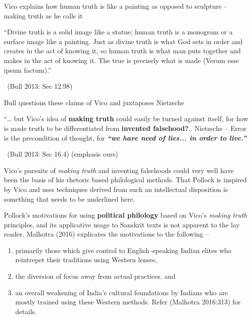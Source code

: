 Vico explains how human truth is like a painting as opposed to sculpture – making truth as he calls it

\begin{myquote}
“Divine truth is a solid image like a statue; human truth is a monogram or a surface image like a painting. Just as divine truth is what God sets in order and creates in the act of knowing it, so human truth is what man puts together and makes in the act of knowing it. The true is precisely what is made (Verum esse ipsum factum).”

~\hfill (Bull 2013: Sec 12.98)
\end{myquote}

Bull questions these claims of Vico and juxtaposes Nietzsche

\begin{myquote}
“… but Vico’s idea of \textbf{making truth} could easily be turned against itself, for how is made truth to be differentiated from \textbf{invented falsehood?}.. Nietzsche – Error is the precondition of thought, for \textbf{\textit{“we have need of lies... in order to live.”}}

~\hfill (Bull 2013: Sec 16.4) (emphasis ours)
\end{myquote}

Vico’s pursuits of \textit{making truth} and inventing falsehoods could very well have been the basis of his rhetoric based philological methods. That Pollock is inspired by Vico and uses techniques derived from such an intellectual disposition is something that needs to be underlined here.

Pollock’s motivations for using \textbf{political philology} based on Vico’s \textit{making truth} principles, and its applicative usage to Sanskrit texts is not apparent to the lay reader. Malhotra (2016) explicates the motivations to the following –

\begin{enumerate}
\itemsep=0pt
\item primarily those which give control to English–speaking Indian elites who reintrepet their traditions using Western lenses,

 \item the diversion of focus away from actual practices. and

 \item an overall weakening of India’s cultural foundations by Indians who are mostly trained using these Western methods. Refer (Malhotra 2016:313) for details.

\end{enumerate}

